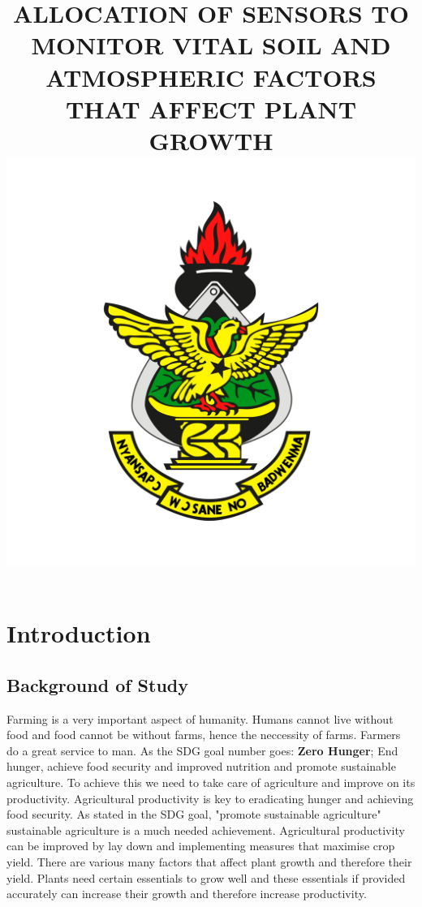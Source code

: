 \documentclass[12pt, a4paper]{article}
\title{ALLOCATION OF SENSORS TO MONITOR VITAL SOIL AND ATMOSPHERIC FACTORS THAT AFFECT PLANT GROWTH
\includegraphics[scale=0.6]{knust}}
\begin{document}
\maketitle
\section{Introduction}
\subsection{Background of Study}
Farming is a very important aspect of humanity. Humans cannot live without food and food cannot be without farms, hence the neccessity of farms. Farmers do a great service to man. As the SDG goal number goes: \textbf{Zero Hunger}; End hunger, achieve food security and improved nutrition and promote sustainable agriculture. To achieve this we need to take care of agriculture and improve on its productivity. Agricultural productivity is key to eradicating hunger and achieving food security. As stated in the SDG goal, "promote sustainable agriculture" sustainable agriculture is a much needed achievement. Agricultural productivity can be improved by lay down and implementing measures that maximise crop yield. There are various many factors that affect plant growth and therefore their yield. Plants need certain essentials to grow well and these essentials if provided accurately can increase their growth and therefore increase productivity.
\\
\end{document}
